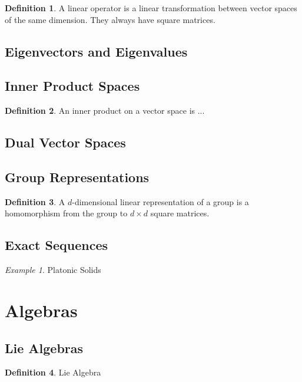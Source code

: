 \documentclass[12pt]{article}
\theoremstyle{definition}
\newtheorem{definition}{Definition}[section]
\theoremstyle{remark}
\theoremstyle{example}
\newtheorem{example}{Example}
\begin{document}
\begin{definition}
	A linear operator is a linear transformation between vector spaces of the same dimension. They always have square matrices.
\end{definition}

\subsection{Eigenvectors and Eigenvalues}

\subsection{Inner Product Spaces}

\begin{definition}
	An inner product on a vector space is ...
\end{definition}

\subsection{Dual Vector Spaces}

\subsection{Group Representations}

\begin{definition}
	A $d$-dimensional linear representation of a group is a homomorphism from the group to $d\times d$ square matrices.
\end{definition}

\subsection{Exact Sequences}

\begin{example}
	Platonic Solids
\end{example}

\section{Algebras}

\subsection{Lie Algebras}

\begin{definition}
	Lie Algebra
\end{definition}
\end{document}
